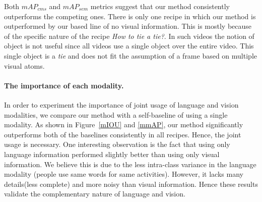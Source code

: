 \begin{table}
\caption{Semantic mean-average-precision $mAP_{sem}$.}
{\small
{}}
\normalsize
\end{table}

Both $mAP_{cms}$ and $mAP_{sem}$ metrics suggest that our method consistently outperforms the competing ones. There is only one recipe in which our method is outperformed by our based line of no visual information. This is mostly because of the specific nature of the recipe \emph{How to tie a tie?}. In such videos the notion of object is not useful since all videos use a single object over the entire video. This single object is a \emph{tie} and does not fit the assumption of a frame based on multiple visual atoms. 


\paragraph{The importance of each modality.}
In order to experiment the importance of joint usage of language and vision modalities, we compare our method with a self-baseline of using a single modality. As shown in Figure~\ref{mIOU} and \ref{mmAP}, our method significantly outperforms both of the baselines consistently in all recipes. Hence, the joint usage is necessary. One interesting observation is the fact that using only language information performed slightly better than using only visual information. We believe this is due to the less intra-class variance in the language modality (\ie people use same words for same activities). However, it lacks many details(less complete) and more noisy than visual information. Hence these results validate the complementary nature of language and vision.
